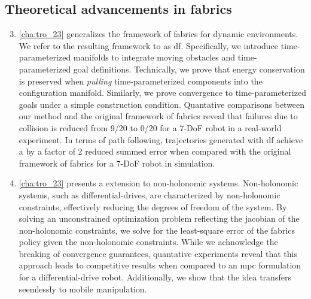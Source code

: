 \subsection{Theoretical advancements in \ac{fabrics}}
\begin{enumerate}
    \setcounter{enumi}{2}
    \item \cref{cha:tro_23} generalizes the framework of \ac{fabrics}
      for dynamic environments. We refer to the resulting
      framework to as \ac{df}. Specifically, we introduce
      time-parameterized manifolds to integrate moving
      obstacles and time-parameterized goal definitions.
      Technically,
      we prove that energy conservation is preserved when
      \textit{pulling} time-parameterized components into
      the configuration manifold. 
      Similarly, we prove convergence to
      time-parameterized goals under a simple construction
      condition. Quantative comparisons between our method
      and the original framework of \ac{fabrics} reveal
      that failures due to collision is reduced from 9/20
      to 0/20 for a 7-DoF robot in a real-world experiment.
      In terms of path following, trajectories generated
      with \ac{df} achieve a by a factor of 2 reduced summed error 
      when compared with the original framework of
      \ac{fabrics} for a 7-DoF robot in simulation.
    \item \cref{cha:tro_23} presents a extension to
      non-holonomic systems. Non-holonomic systems, such as
      differential-drives, are characterized by
      non-holonomic constraints, effectively reducing the
      degrees of freedom of the system. By solving an
      unconstrained optimization problem reflecting the
      jacobian of the non-holonomic constraints, we solve
      for the least-square error of the \ac{fabrics} policy
      given the non-holonomic constraints. While we
      achnowledge the breaking of convergence guarantees,
      quantative experiments reveal that this approach leads to
      competitive results when compared to an \ac{mpc}
      formulation for a differential-drive robot.
      Additionally, we show that the idea transfers seemlessly
      to mobile manipulation.
\end{enumerate}

